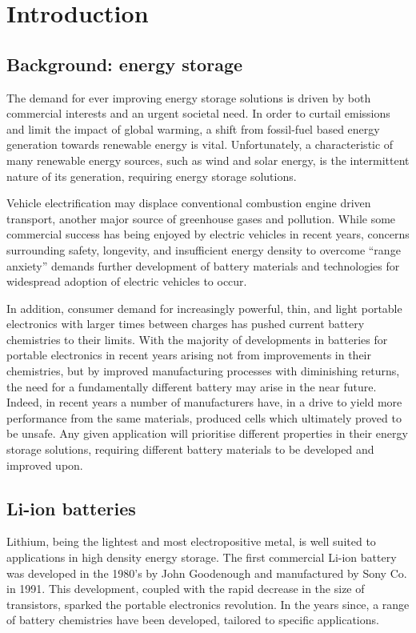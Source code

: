 \chapter{Introduction}
\section{Background: energy storage}
The demand for ever improving energy storage solutions is driven by both commercial interests and an urgent societal need.
In order to curtail  emissions and limit the impact of global warming, a shift from fossil-fuel based energy generation towards renewable energy is vital.\cite{Goodenough2013}
Unfortunately, a characteristic of many renewable energy sources, such as wind and solar energy, is the intermittent nature of its generation, \cite{Goodenough2010a,Ellis2012,Liu2013} requiring energy storage solutions.

Vehicle electrification may displace conventional combustion engine driven transport, another major source of greenhouse gases and pollution.\cite{Blomgren2017}
While some commercial success has being enjoyed by electric vehicles in recent years, concerns surrounding safety, longevity, and insufficient energy density to overcome ``range anxiety'' demands further development of battery materials and technologies for widespread adoption of electric vehicles to occur.\cite{Cano2018a,Schmuch2018}

In addition, consumer demand for increasingly powerful, thin, and light portable electronics with larger times between charges has pushed current battery chemistries to their limits.\cite{Liu2010}
With the majority of developments in batteries for portable electronics in recent years arising not from improvements in their chemistries, but by improved manufacturing processes with diminishing returns, the need for a fundamentally different battery may arise in the near future.
Indeed, in recent years a number of manufacturers have, in a drive to yield more performance from the same materials, produced cells which ultimately proved to be unsafe.\cite{Loveridge2018}
Any given application will prioritise different properties in their energy storage solutions, requiring different battery materials to be developed and improved upon.

\section{Li-ion batteries}
Lithium, being the lightest and most electropositive metal,\cite{Tarascon2010} is well suited to applications in high density energy storage.
The first commercial Li-ion battery was developed in the 1980's by John Goodenough\cite{Mizushima1981} and manufactured by Sony Co. in 1991.\cite{Li2018}
This development, coupled with the rapid decrease in the size of transistors, sparked the portable electronics revolution.
In the years since, a range of battery chemistries have been developed, tailored to specific applications.


